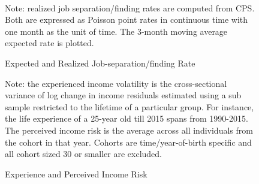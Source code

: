      
    \clearpage
    \begin{figure}[!ht]
      \caption{Expected and Realized Job-separation/finding Rate}
    \label{fig:srate_compare}
    	\begin{center} \\
    	\medskip
    	\end{center}
    \begin{flushleft}Note: realized job separation/finding rates are computed from CPS. Both are expressed as Poisson point rates in continuous time with one month as the unit of time. The 3-month moving average expected rate is plotted.\end{flushleft}
    \end{figure}
    
 \newpage
 
\begin{figure}[!ht]
	\caption{Experience and Perceived Income Risk}
	\label{fig:var_experience_data}
	\begin{center}
\end{center}
\begin{flushleft}Note: the experienced income volatility is the cross-sectional variance of log change in income residuals estimated using a sub sample restricted to the lifetime of a particular group. For instance, the life experience of a 25-year old till 2015 spans from 1990-2015. The perceived income risk is the average across all individuals from the cohort in that year. Cohorts are time/year-of-birth specific and all cohort sized 30 or smaller are excluded.\end{flushleft}
\end{figure}



 \newpage
 
